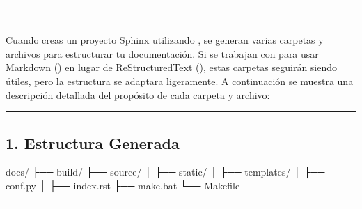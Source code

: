 \documentclass[a4paper,10pt,spanish]{sphinxmanual}
\begin{document}
\bigskip\hrule\bigskip


\sphinxstepscope


\section{}
\label{\detokenize{configuracion_inicial/004.estructura_inicial_proyecto:estructura-inicial-del-proyecto}}\label{\detokenize{configuracion_inicial/004.estructura_inicial_proyecto::doc}}
\sphinxAtStartPar
Cuando creas un proyecto Sphinx utilizando , se generan varias carpetas y archivos para estructurar tu documentación. Si se trabajan con  para usar Markdown () en lugar de ReStructuredText (), estas carpetas seguirán siendo útiles, pero la estructura se adaptara ligeramente. A continuación se muestra una descripción detallada del propósito de cada carpeta y archivo:


\bigskip\hrule\bigskip



\subsection{1. Estructura Generada}
\label{\detokenize{configuracion_inicial/004.estructura_inicial_proyecto:estructura-generada}}
\begin{sphinxVerbatim}[commandchars=\\\{\}]
docs/
├── build/
├── source/
│   ├── \PYGZus{}static/
│   ├── \PYGZus{}templates/
│   ├── conf.py
│   ├── index.rst
├── make.bat
└── Makefile
\end{sphinxVerbatim}


\bigskip\hrule\bigskip
\end{document}
